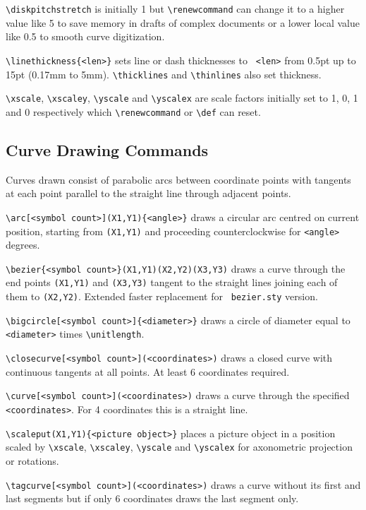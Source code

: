 \begin{hanging}
      \verb?\diskpitchstretch? is initially 1 but \verb?\renewcommand? can
change it to a higher value like 5 to save memory in drafts of complex
documents or a lower local value like 0.5 to smooth curve digitization.

      \verb?\linethickness{<len>}? sets line or dash thicknesses to {\tt
<len>} from 0.5pt up to 15pt (0.17mm to 5mm). \verb?\thicklines? and
\verb?\thinlines? also set thickness.

     \verb?\xscale?, \verb?\xscaley?, \verb?\yscale? and \verb?\yscalex? are
scale factors initially set to 1, 0, 1 and 0 respectively which
\verb?\renewcommand? or \verb?\def? can reset.
    \end{hanging}


    \subsection{Curve Drawing Commands}
  Curves drawn consist of parabolic arcs between coordinate points with
tangents at each point parallel to the straight line through adjacent points.

    \begin{hanging}
    \verb?\arc[<symbol count>](X1,Y1){<angle>}? draws a circular arc centred
on current position, starting from {\tt (X1,Y1)} and proceeding
counterclockwise for {\tt <angle>} degrees.

    \verb?\bezier{<symbol count>}(X1,Y1)(X2,Y2)(X3,Y3)? draws a curve through
the end points {\tt (X1,Y1)} and {\tt (X3,Y3)} tangent to the straight lines
joining each of them to {\tt (X2,Y2)}. Extended faster replacement for {\tt
bezier.sty} version.

    \verb?\bigcircle[<symbol count>]{<diameter>}? draws a circle of diameter
equal to {\tt <diameter>} times \verb?\unitlength?.

    \verb?\closecurve[<symbol count>](<coordinates>)? draws a closed curve
with continuous tangents at all points. At least 6 coordinates required.

    \verb?\curve[<symbol count>](<coordinates>)? draws a curve through the
specified {\tt <coordinates>}. For 4 coordinates this is a straight line.

    \verb?\scaleput(X1,Y1){<picture object>}? places a picture object in a
position scaled by \verb?\xscale?, \verb?\xscaley?, \verb?\yscale? and
\verb?\yscalex? for axonometric projection or rotations.

    \verb?\tagcurve[<symbol count>](<coordinates>)? draws a curve without its
first and last segments but if only 6 coordinates draws the last segment only.
      \end{hanging}
   
